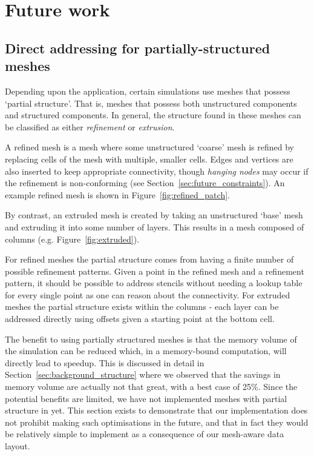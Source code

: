 \section{Future work}
\label{sec:future}

\subsection{Direct addressing for partially-structured meshes}
\label{sec:future_partialstructure}

Depending upon the application, certain simulations use meshes that possess `partial structure'.
That is, meshes that possess both unstructured components and structured components.
In general, the structure found in these meshes can be classified as either \textit{refinement} or \textit{extrusion}.

A refined mesh is a mesh where some unstructured `coarse' mesh is refined by replacing cells of the mesh with multiple, smaller cells.
Edges and vertices are also inserted to keep appropriate connectivity, though \textit{hanging nodes} may occur if the refinement is non-conforming (see Section~\ref{sec:future_constraints}).
An example refined mesh is shown in Figure~\ref{fig:refined_patch}.

By contrast, an extruded mesh is created by taking an unstructured `base' mesh and extruding it into some number of layers.
This results in a mesh composed of columns (e.g. Figure~\ref{fig:extruded}).

For refined meshes the partial structure comes from having a finite number of possible refinement patterns.
Given a point in the refined mesh and a refinement pattern, it should be possible to address stencils without needing a lookup table for every single point as one can reason about the connectivity.
For extruded meshes the partial structure exists within the columns - each layer can be addressed directly using offsets given a starting point at the bottom cell.

The benefit to using partially structured meshes is that the memory volume of the simulation can be reduced which, in a memory-bound computation, will directly lead to speedup.
This is discussed in detail in Section~\ref{sec:background_structure} where we observed that the savings in memory volume are actually not that great, with a best case of 25\%.
Since the potential benefits are limited, we have not implemented meshes with partial structure in  yet.
This section exists to demonstrate that our implementation does not prohibit making such optimisations in the future, and that in fact they would be relatively simple to implement as a consequence of our mesh-aware data layout.

